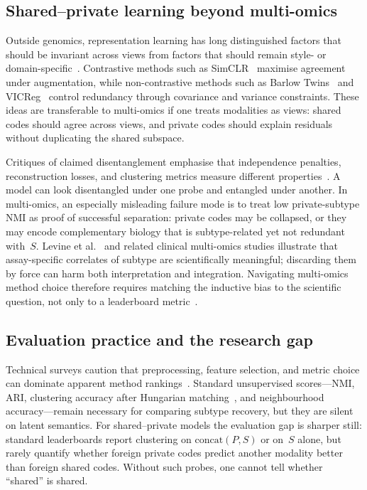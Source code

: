 \subsection{Shared--private learning beyond multi-omics}

Outside genomics, representation learning has long distinguished factors that should be invariant across views from factors that should remain style- or domain-specific~\citep{bengio2013representation,Goodfellow-et-al-2016}. Contrastive methods such as SimCLR~\citep{chen2020simple} maximise agreement under augmentation, while non-contrastive methods such as Barlow Twins~\citep{zbontar2021barlow} and VICReg~\citep{bardes2022vicreg} control redundancy through covariance and variance constraints. These ideas are transferable to multi-omics if one treats modalities as views: shared codes should agree across views, and private codes should explain residuals without duplicating the shared subspace.

Critiques of claimed disentanglement emphasise that independence penalties, reconstruction losses, and clustering metrics measure different properties~\citep{martens2024disentangling}. A model can look disentangled under one probe and entangled under another. In multi-omics, an especially misleading failure mode is to treat low private-subtype NMI as proof of successful separation: private codes may be collapsed, or they may encode complementary biology that is subtype-related yet not redundant with~$S$. Levine et al.~\citep{levine2013integrated} and related clinical multi-omics studies illustrate that assay-specific correlates of subtype are scientifically meaningful; discarding them by force can harm both interpretation and integration. Navigating multi-omics method choice therefore requires matching the inductive bias to the scientific question, not only to a leaderboard metric~\citep{mohr2024navigating}.

\subsection{Evaluation practice and the research gap}

Technical surveys caution that preprocessing, feature selection, and metric choice can dominate apparent method rankings~\citep{baiao2025technical,rappoport2021evaluation,cantini2021benchmarking}. Standard unsupervised scores---NMI, ARI, clustering accuracy after Hungarian matching~\citep{Kuhn1955Hungarian}, and neighbourhood accuracy---remain necessary for comparing subtype recovery, but they are silent on latent semantics. For shared--private models the evaluation gap is sharper still: standard leaderboards report clustering on $\mathrm{concat}(P,S)$ or on~$S$ alone, but rarely quantify whether foreign private codes predict another modality better than foreign shared codes. Without such probes, one cannot tell whether ``shared'' is shared.

